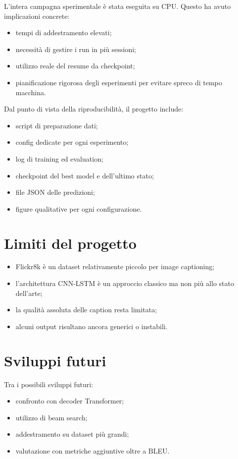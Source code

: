 \documentclass[12pt,a4paper]{article}
\begin{document}
L'intera campagna sperimentale è stata eseguita su CPU. Questo ha avuto implicazioni concrete:
\begin{itemize}[leftmargin=*]
    \item tempi di addestramento elevati;
    \item necessità di gestire i run in più sessioni;
    \item utilizzo reale del resume da checkpoint;
    \item pianificazione rigorosa degli esperimenti per evitare spreco di tempo macchina.
\end{itemize}

Dal punto di vista della riproducibilità, il progetto include:
\begin{itemize}[leftmargin=*]
    \item script di preparazione dati;
    \item config dedicate per ogni esperimento;
    \item log di training ed evaluation;
    \item checkpoint del best model e dell'ultimo stato;
    \item file JSON delle predizioni;
    \item figure qualitative per ogni configurazione.
\end{itemize}

\section{Limiti del progetto}

\begin{itemize}[leftmargin=*]
    \item Flickr8k è un dataset relativamente piccolo per image captioning;
    \item l'architettura CNN-LSTM è un approccio classico ma non più allo stato dell'arte;
    \item la qualità assoluta delle caption resta limitata;
    \item alcuni output risultano ancora generici o instabili.
\end{itemize}

\section{Sviluppi futuri}

Tra i possibili sviluppi futuri:
\begin{itemize}[leftmargin=*]
    \item confronto con decoder Transformer;
    \item utilizzo di beam search;
    \item addestramento su dataset più grandi;
    \item valutazione con metriche aggiuntive oltre a BLEU.
\end{itemize}
\end{document}
